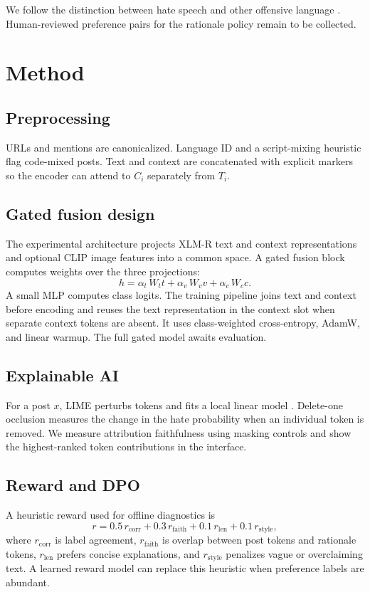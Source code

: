 \documentclass[11pt]{article}
\begin{document}
We follow the distinction between hate speech and other offensive language \cite{davidson2017hate}. Human-reviewed preference pairs for the rationale policy remain to be collected.

\section{Method}

\subsection{Preprocessing}
URLs and mentions are canonicalized. Language ID and a script-mixing heuristic flag code-mixed posts. Text and context are concatenated with explicit markers so the encoder can attend to \(C_i\) separately from \(T_i\).

\subsection{Gated fusion design}
The experimental architecture projects XLM-R text and context representations and optional CLIP image features into a common space. A gated fusion block computes weights over the three projections:
\begin{equation}
h = \alpha_t\,W_t t + \alpha_v\,W_v v + \alpha_c\,W_c c.
\end{equation}
A small MLP computes class logits. The training pipeline joins text and context before encoding and reuses the text representation in the context slot when separate context tokens are absent. It uses class-weighted cross-entropy, AdamW, and linear warmup. The full gated model awaits evaluation.

\subsection{Explainable AI}
For a post \(x\), LIME perturbs tokens and fits a local linear model \cite{ribeiro2016lime}. Delete-one occlusion measures the change in the hate probability when an individual token is removed. We measure attribution faithfulness using masking controls and show the highest-ranked token contributions in the interface.

\subsection{Reward and DPO}
A heuristic reward used for offline diagnostics is
\begin{equation}
r = 0.5\,r_{\mathrm{corr}} + 0.3\,r_{\mathrm{faith}} + 0.1\,r_{\mathrm{len}} + 0.1\,r_{\mathrm{style}},
\end{equation}
where \(r_{\mathrm{corr}}\) is label agreement, \(r_{\mathrm{faith}}\) is overlap between post tokens and rationale tokens, \(r_{\mathrm{len}}\) prefers concise explanations, and \(r_{\mathrm{style}}\) penalizes vague or overclaiming text. A learned reward model can replace this heuristic when preference labels are abundant.
\end{document}
